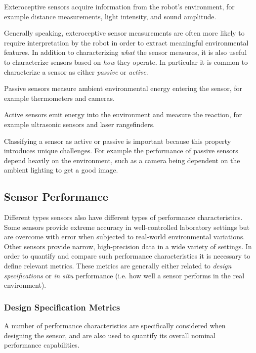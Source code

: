 \begin{definition}[Exteroceptive]
Exteroceptive sensors acquire information from the robot’s environment, for example distance measurements, light intensity, and sound amplitude. 
\end{definition}
Generally speaking, exteroceptive sensor measurements are often more likely to require interpretation by the robot in order to extract meaningful environmental features.
In addition to characterizing \textit{what} the sensor measures, it is also useful to characterize sensors based on \textit{how} they operate. In particular it is common to characterize a sensor as either \textit{passive} or \textit{active}.
\begin{definition}
Passive sensors measure ambient environmental energy entering the sensor, for example thermometers and cameras.
\end{definition}
\begin{definition}
Active sensors emit energy into the environment and measure the reaction, for example ultrasonic sensors and laser rangefinders. 
\end{definition}
Classifying a sensor as active or passive is important because this property introduces unique challenges. For example the performance of passive sensors depend heavily on the environment, such as a camera being dependent on the ambient lighting to get a good image.


\subsection{Sensor Performance}
Different types sensors also have different types of performance characteristics. Some sensors provide extreme accuracy in well-controlled laboratory settings but are overcome with error when subjected to real-world environmental variations. Other sensors provide narrow, high-precision data in a wide variety of settings. In order to quantify and compare such performance characteristics it is necessary to define relevant metrics. These metrics are generally either related to \textit{design specifications} or \textit{in situ} performance (i.e. how well a sensor performs in the real environment). 

\subsubsection{Design Specification Metrics} 
A number of performance characteristics are specifically considered when designing the sensor, and are also used to quantify its overall nominal performance capabilities.

